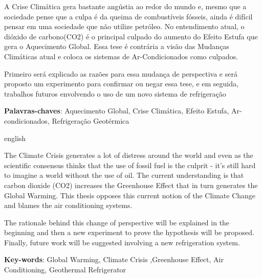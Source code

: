 
\setlength{\absparsep}{18pt} %
\begin{resumo}

A Crise Climática gera bastante angústia ao redor do mundo e, mesmo que a sociedade pense que a culpa é da queima de combustíveis fósseis, ainda é difícil pensar em uma sociedade que não utilize petróleo. No entendimento atual, o dióxido de carbono(CO2) é o principal culpado do aumento do Efeito Estufa que gera o Aquecimento Global. Essa tese é contrária a visão das Mudanças Climáticas atual e coloca os sistemas de Ar-Condicionados como culpados.
\par
Primeiro será explicado as razões para essa mudança de perspectiva e será proposto um experimento para confirmar ou negar essa tese, e em seguida, trabalhos futuros envolvendo o uso de um novo sistema de refrigeração

    \vspace{\onelineskip}
    \noindent 
    \textbf{Palavras-chaves}: Aquecimento Global, Crise Climática, Efeito Estufa, Ar-condicionados, Refrigeração Geotérmica
\end{resumo}

\begin{resumo}[Abstract]
 \begin{otherlanguage*}{english}

The Climate Crisis generates a lot of distress around the world and even as the scientific consensus thinks that the use of fossil fuel is the culprit - it's still hard to imagine a world without the use of oil. The current understanding is that carbon dioxide (CO2) increases the Greenhouse Effect that in turn generates the Global Warming. This thesis opposes this current notion of the Climate Change and blames the air conditioning systems.
\par
The rationale behind this change of perspective will be explained in the beginning and then a new experiment to prove the hypothesis will be proposed. Finally, future work will be suggested involving a new refrigeration system.

    \vspace{\onelineskip}
    \noindent 
    \textbf{Key-words}: Global Warming, Climate Crisis ,Greenhouse Effect, Air Conditioning, Geothermal Refrigerator
 \end{otherlanguage*}
\end{resumo}
